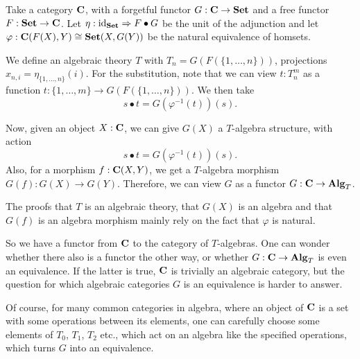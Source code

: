\begin{example}
  Take a category $ \mathbf{C} $, with a forgetful functor $ G: \mathbf{C} \to \mathbf{Set} $ and a free functor $ F: \mathbf{Set} \to \mathbf{C} $. Let $ \eta: \text{id}_{\mathbf{Set}} \Rightarrow F \bullet G $ be the unit of the adjunction and let $ \varphi: \mathbf{C}(F(X), Y) \cong \mathbf{Set}(X, G(Y)) $ be the natural equivalence of homsets.

  We define an algebraic theory $ T $ with $ T_n = G(F(\{ 1, \dots, n \})) $, projections $ x_{n, i} = \eta_{\{1, \dots, n\}}(i) $. For the substitution, note that we can view $ t: T_n^m $ as a function $ t: \{ 1, \dots, m \} \to G(F(\{ 1, \dots, n \})) $. We then take
  \[ s \bullet t = G(\varphi^{-1}(t))(s). \]

  Now, given an object $ X: \mathbf{C} $, we can give $ G(X) $ a $ T $-algebra structure, with action
  \[ s \bullet t = G(\varphi^{-1}(t))(s). \]
  Also, for a morphism $ f: \mathbf{C}(X, Y) $, we get a $ T $-algebra morphism $ G(f): G(X) \to G(Y) $. Therefore, we can view $ G $ as a functor $ G: \mathbf{C} \to \mathbf{Alg}_{T} $.
\end{example}

The proofs that $ T $ is an algebraic theory, that $ G(X) $ is an algebra and that $ G(f) $ is an algebra morphism mainly rely on the fact that $ \varphi $ is natural.

So we have a functor from $ \mathbf{C} $ to the category of $ T $-algebras. One can wonder whether there also is a functor the other way, or whether $ G: \mathbf{C} \to \mathbf{Alg}_{T} $ is even an equivalence. If the latter is true, $ \mathbf{C} $ is trivially an algebraic category, but the question for which algebraic categories $ G $ is an equivalence is harder to answer.

Of course, for many common categories in algebra, where an object of $ \mathbf{C} $ is a set with some operations between its elements, one can carefully choose some elements of $ T_0 $, $ T_1 $, $ T_2 $ etc., which act on an algebra like the specified operations, which turns $ G $ into an equivalence.

